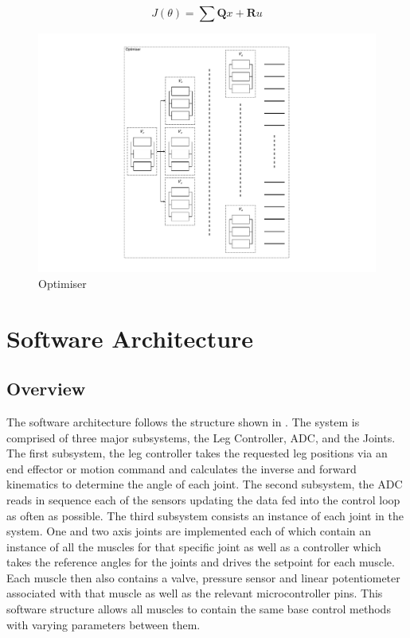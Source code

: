 \documentclass[11pt,a4paper]{article}
\begin{document}
\begin{equation}
    J(\theta) = \sum\textbf{Q}x + \textbf{R}u
    \label{math:cost_function}
\end{equation}

\begin{figure}[hbt!]
    \centering
    \includegraphics[clip, trim=1cm 1cm 1cm 1cm, width=1.00\textwidth]{BlockDiagram_Optimiser.pdf}
    \caption{Optimiser}
    \label{fig:control_diagram_optimiser}
\end{figure}

\newpage
\section{Software Architecture}
\label{sub:software}

\subsection{Overview}
\label{sub:software_overview}

The software architecture follows the structure shown in . The system is comprised of three major subsystems, the Leg Controller, ADC, and the Joints. The first subsystem, the leg controller takes the requested leg positions via an end effector or motion command and calculates the inverse and forward kinematics to determine the angle of each joint. The second subsystem, the ADC reads in sequence each of the sensors updating the data fed into the control loop as often as possible. The third subsystem consists an instance of each joint in the system. One and two axis joints are implemented each of which contain an instance of all the muscles for that specific joint as well as a controller which takes the reference angles for the joints and drives the setpoint for each muscle. Each muscle then also contains a valve, pressure sensor and linear potentiometer associated with that muscle as well as the relevant microcontroller pins. This software structure allows all muscles to contain the same base control methods with varying parameters between them.
\end{document}
